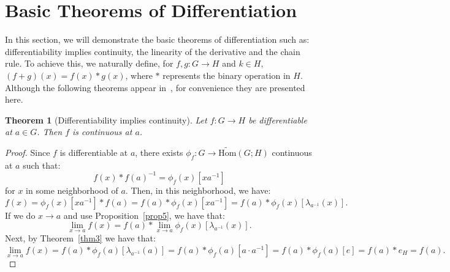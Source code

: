 \documentclass{article}
\newtheorem{theorem}{Theorem}[section]
\numberwithin{theorem}{section}
\numberwithin{equation}{section}
\begin{document}
\section{Basic Theorems of Differentiation}

In this section, we will demonstrate the basic theorems of differentiation such as: differentiability implies continuity, the linearity of the derivative and the chain rule. To achieve this, we naturally define, for $f, g : G \to H$ and $k \in H$, $(f + g)(x) = f(x) \ast g(x)$, where $\ast$ represents the binary operation in $H$. Although the following theorems appear in~\cite{arora2021}, for convenience they are presented here.

\begin{theorem}[Differentiability implies continuity]\label{thm6}
Let $f : G \to H$ be differentiable at $a \in G$. Then $f$ is continuous at $a$.
\end{theorem}
\begin{proof}
Since $f$ is differentiable at $a$, there exists $\phi_f : G \to \tilde{\mathrm{Hom}}(G; H)$ continuous at $a$ such that:
\[
f(x) \ast f(a)^{-1} = \phi_f(x)[x a^{-1}]
\]
for $x$ in some neighborhood of $a$. Then, in this neighborhood, we have:
\[
f(x) = \phi_f(x)[x a^{-1}] \ast f(a) = f(a) \ast \phi_f(x)[x a^{-1}] = f(a) \ast \phi_f(x)[\lambda_{a^{-1}}(x)].
\]
If we do $x \to a$ and use Proposition~\ref{prop5}, we have that:
\[
\lim_{x\to a} f(x) = f(a) \ast \lim_{x\to a} \phi_f(x)[\lambda_{a^{-1}}(x)].
\]
Next, by Theorem~\ref{thm3} we have that:
\[
\lim_{x\to a} f(x) = f(a) \ast \phi_f(a)[\lambda_{a^{-1}}(a)] = f(a) \ast \phi_f(a)[a \cdot a^{-1}] = f(a) \ast \phi_f(a)[e] = f(a) \ast e_H = f(a).
\]
\end{proof}
\end{document}
